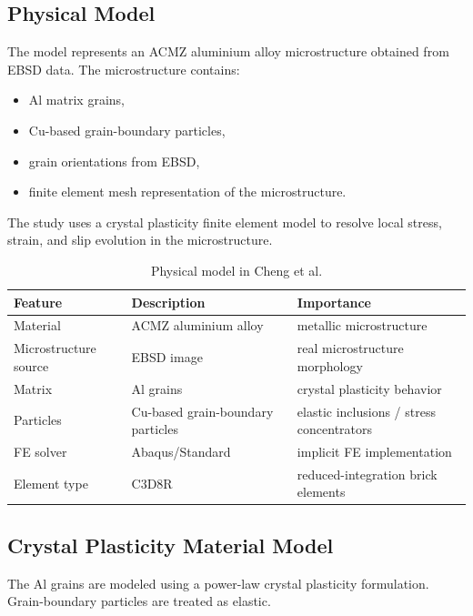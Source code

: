 \documentclass[11pt,a4paper]{article}
\begin{document}
\subsection{Physical Model}

The model represents an ACMZ aluminium alloy microstructure obtained from EBSD data. The microstructure contains:

\begin{itemize}
    \item Al matrix grains,
    \item Cu-based grain-boundary particles,
    \item grain orientations from EBSD,
    \item finite element mesh representation of the microstructure.
\end{itemize}

The study uses a crystal plasticity finite element model to resolve local stress, strain, and slip evolution in the microstructure.

\begin{table}[H]
\centering
\caption{Physical model in Cheng et al.}
\begin{tabular}{lll}
\toprule
Feature & Description & Importance \\
\midrule
Material & ACMZ aluminium alloy & metallic microstructure \\
Microstructure source & EBSD image & real microstructure morphology \\
Matrix & Al grains & crystal plasticity behavior \\
Particles & Cu-based grain-boundary particles & elastic inclusions / stress concentrators \\
FE solver & Abaqus/Standard & implicit FE implementation \\
Element type & C3D8R & reduced-integration brick elements \\
\bottomrule
\end{tabular}
\end{table}

\subsection{Crystal Plasticity Material Model}

The Al grains are modeled using a power-law crystal plasticity formulation. Grain-boundary particles are treated as elastic.
\end{document}
